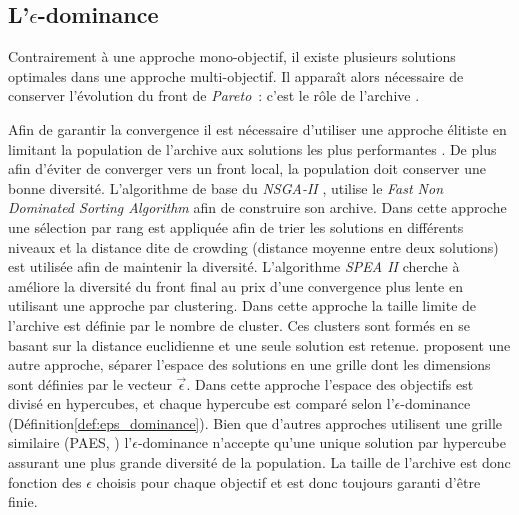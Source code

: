\subsection[L’epsilon-dominance]{L’$\epsilon$-dominance} %
\label{sub:l_epsilon_dominance}
Contrairement à une approche mono-objectif, il existe plusieurs solutions optimales
dans une approche multi-objectif. Il apparaît alors nécessaire de conserver l’évolution
du front de \textit{Pareto}~: c’est le rôle de l’archive \parencite{Laumanns2002263}.

Afin de garantir la convergence il est nécessaire d’utiliser une approche élitiste
en limitant la population de l’archive aux solutions les plus performantes \parencite{Zitzler2000173}.
De plus afin d’éviter de converger vers un front local, la population doit conserver
une bonne diversité.
L’algorithme de base du \textit{NSGA-II} \parencite{Deb2002182}, utilise le \textit{Fast
Non Dominated Sorting Algorithm} afin de construire son archive. Dans cette approche une
sélection par rang est appliquée afin de trier les solutions en différents niveaux et la
distance dite de crowding (distance moyenne entre deux solutions) est utilisée afin de
maintenir la diversité. L’algorithme \textit{SPEA II} cherche à améliore la diversité du
front final au prix d’une convergence plus lente en utilisant une approche par clustering.
Dans cette approche la taille limite de l’archive est définie par le nombre de cluster.
Ces clusters sont formés en se basant sur la distance euclidienne et une seule solution
est retenue.
\cite{Laumanns2002263} proposent une autre approche, séparer l’espace des solutions en une
grille dont les dimensions sont définies par le vecteur $\vec{\epsilon}$. Dans cette
approche l’espace des objectifs est divisé en hypercubes, et chaque hypercube est comparé
selon l’$\epsilon$-dominance (Définition\ref{def:eps_dominance}). Bien que d’autres
approches utilisent une grille similaire (PAES, \cite{Knowles2000149})
l’$\epsilon$-dominance n’accepte qu’une unique solution par hypercube assurant une plus
grande diversité de la population. La taille de l’archive est donc fonction des $\epsilon$
choisis pour chaque objectif et est donc toujours garanti d’être finie.



